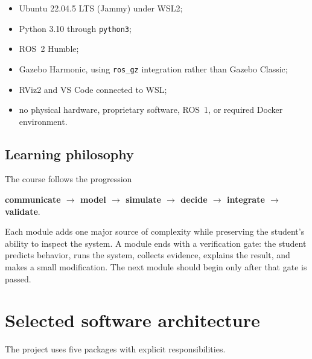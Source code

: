 \documentclass[11pt]{article}
\newcommand{\ros}{ROS~2 Humble}
\newcommand{\gazebo}{Gazebo Harmonic}
\begin{document}
\begin{itemize}
  \item Ubuntu 22.04.5 LTS (Jammy) under WSL2;
  \item Python 3.10 through \texttt{python3};
  \item \ros{};
  \item \gazebo{}, using \texttt{ros\_gz} integration rather than Gazebo
        Classic;
  \item RViz2 and VS Code connected to WSL;
  \item no physical hardware, proprietary software, ROS~1, or required Docker
        environment.
\end{itemize}

\subsection{Learning philosophy}

The course follows the progression

\begin{center}
\textbf{communicate $\rightarrow$ model $\rightarrow$ simulate
$\rightarrow$ decide $\rightarrow$ integrate $\rightarrow$ validate}.
\end{center}

Each module adds one major source of complexity while preserving the student's
ability to inspect the system. A module ends with a verification gate: the
student predicts behavior, runs the system, collects evidence, explains the
result, and makes a small modification. The next module should begin only after
that gate is passed.

\section{Selected software architecture}

The project uses five packages with explicit responsibilities.
\end{document}
